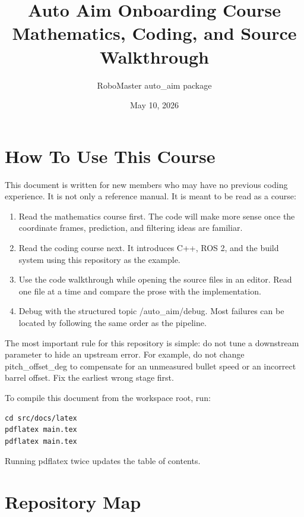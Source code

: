\documentclass[11pt,oneside]{report}
\title{
  Auto Aim Onboarding Course\\
  \large Mathematics, Coding, and Source Walkthrough
}
\author{RoboMaster auto\_aim package}
\date{May 10, 2026}
\DeclareRobustCommand{\code}[1]{\texttt{\detokenize{#1}}}
\DeclareRobustCommand{\topic}[1]{\texttt{\detokenize{#1}}}
\DeclareRobustCommand{\param}[1]{\texttt{\detokenize{#1}}}
\def\code#1{#1}%
\def\topic#1{#1}%
\def\param#1{#1}%
\begin{document}
\maketitle
\tableofcontents

\chapter*{How To Use This Course}

This document is written for new members who may have no previous coding
experience. It is not only a reference manual. It is meant to be read as a
course:

\begin{enumerate}
  \item Read the mathematics course first. The code will make more sense once
  the coordinate frames, prediction, and filtering ideas are familiar.
  \item Read the coding course next. It introduces C++, ROS 2, and the build
  system using this repository as the example.
  \item Use the code walkthrough while opening the source files in an editor.
  Read one file at a time and compare the prose with the implementation.
  \item Debug with the structured topic \topic{/auto_aim/debug}. Most failures
  can be located by following the same order as the pipeline.
\end{enumerate}

The most important rule for this repository is simple: do not tune a downstream
parameter to hide an upstream error. For example, do not change
\param{pitch_offset_deg} to compensate for an unmeasured bullet speed or an
incorrect barrel offset. Fix the earliest wrong stage first.

To compile this document from the workspace root, run:

\begin{lstlisting}
cd src/docs/latex
pdflatex main.tex
pdflatex main.tex
\end{lstlisting}

Running \code{pdflatex} twice updates the table of contents.

\chapter*{Repository Map}
\end{document}
